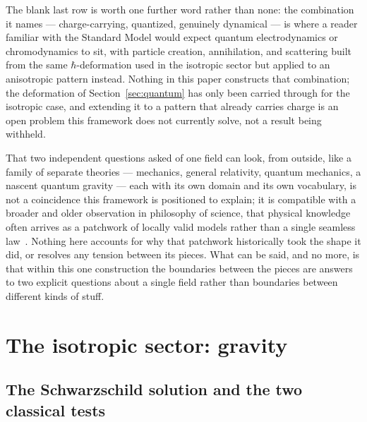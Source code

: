 \documentclass[aps,prd,twocolumn,superscriptaddress,nofootinbib]{revtex4-2}
\begin{document}
The blank last row is worth one further word rather than none: the
combination it names — charge-carrying, quantized, genuinely dynamical —
is where a reader familiar with the Standard Model would expect quantum
electrodynamics or chromodynamics to sit, with particle creation,
annihilation, and scattering built from the same $\hbar$-deformation used
in the isotropic sector but applied to an anisotropic pattern instead.
Nothing in this paper constructs that combination; the deformation of
Section~\ref{sec:quantum} has only been carried through for the isotropic
case, and extending it to a pattern that already carries charge is an
open problem this framework does not currently solve, not a result being
withheld.

That two independent questions asked of one field can look, from
outside, like a family of separate theories — mechanics, general
relativity, quantum mechanics, a nascent quantum gravity — each with its
own domain and its own vocabulary, is not a coincidence this framework is
positioned to explain; it is compatible with a broader and older
observation in philosophy of science, that physical knowledge often
arrives as a patchwork of locally valid models rather than a single
seamless law~\cite{Cartwright1999}. Nothing here accounts for why that
patchwork historically took the shape it did, or resolves any tension
between its pieces. What can be said, and no more, is that within this
one construction the boundaries between the pieces are answers to two
explicit questions about a single field rather than boundaries between
different kinds of stuff.

\section{The isotropic sector: gravity}\label{sec:gravity}

\subsection{The Schwarzschild solution and the two classical tests}
\end{document}
